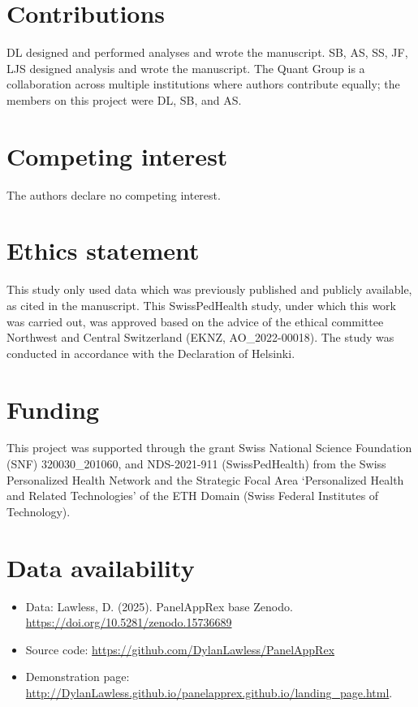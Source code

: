 \section*{Contributions}
\noindent 
DL designed and performed analyses and wrote the manuscript.
SB, AS, SS, JF, LJS designed analysis and wrote the manuscript.
The Quant Group is a collaboration across multiple institutions where authors contribute equally; the members on this project were DL, SB, and AS.

\section*{Competing interest}
\noindent
The authors declare no competing interest. 

\section*{Ethics statement}
\noindent
This study only used data which was previously published and publicly available, as cited in the manuscript.
This  SwissPedHealth study, under which this work was carried out, was approved based on the advice of the ethical committee Northwest and Central Switzerland (EKNZ, AO\_2022-00018). 
The study was conducted in accordance with the Declaration of Helsinki.

\section*{Funding}
\noindent This project was supported through the grant Swiss National Science Foundation  (SNF) 320030\_201060, and NDS-2021-911 (SwissPedHealth) from the Swiss Personalized Health Network and the Strategic Focal Area `Personalized Health and Related Technologies' of the ETH Domain (Swiss Federal Institutes of Technology).

\section*{Data availability}
\begin{itemize}
\item Data: Lawless, D. (2025). PanelAppRex base Zenodo. \url{https://doi.org/10.5281/zenodo.15736689}
\item Source code: \url{https://github.com/DylanLawless/PanelAppRex}
\item Demonstration page: \url{http://DylanLawless.github.io/panelapprex.github.io/landing_page.html}. 
\end{itemize}

